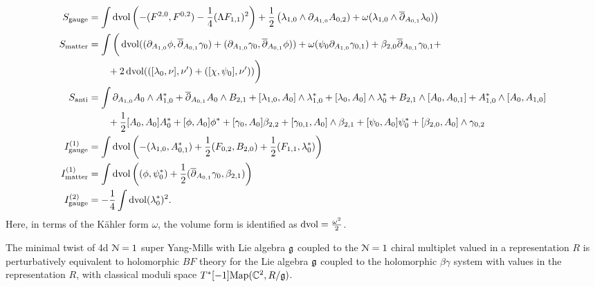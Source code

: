 \documentclass[10pt, oneside]{article}
\begin{document}
\begin{align*}
S_{\mathrm{gauge}} &= \int \operatorname{dvol} \left(-(F^{2, 0}, F^{0, 2}) - \frac{1}{4}(\Lambda F_{1, 1})^2\right) + \frac 12 \left(\lambda_{1,0} \wedge \partial_{A_{1,0}} A_{0,2}) + \omega (\lambda_{1,0} \wedge \overline{\partial}_{A_{0,1}} \lambda_0) \right)  \\
S_{\mathrm{matter}} &= \int \bigg( \operatorname{dvol} ((\partial_{A_{1,0}}\phi , \overline{\partial}_{A_{0,1}} \gamma_0) + (\partial_{A_{1,0}}\gamma_0, \overline{\partial}_{A_{0,1}} \phi)) + \omega (\psi_0 \partial_{A_{1,0}} \gamma_{0,1}) + \beta_{2,0} \overline{\partial}_{A_{0,1}} \gamma_{0,1}  + \\
&\qquad + 2\operatorname{dvol}(([\lambda_0,\nu],\nu') + ([\chi, \psi_0], \nu') )   \bigg) \\
S_{\mathrm{anti}} &= \int \partial_{A_{1, 0}} A_0 \wedge A_{1,0}^* + \overline{\partial}_{A_{0, 1}} A_0\wedge B_{2,1} + [\lambda_{1,0}, A_0]\wedge \lambda_{1,0}^* +  [\lambda_{0}, A_0]\wedge \lambda_{0}^* +B_{2,1} \wedge [A_0, A_{0,1}] + A_{1,0}^* \wedge [A_{0}, A_{1,0}] \\
&\qquad + \frac{1}{2}[A_0, A_0]A_0^* + [\phi, A_0] \phi^* + [\gamma_0, A_0] \beta_{2,2} + [\gamma_{0,1}, A_0]\wedge \beta_{2,1} + [\psi_0, A_0] \psi_0^* + [\beta_{2,0}, A_0] \wedge \gamma_{0,2} \\
I^{(1)}_{\mathrm{gauge}} &=  \int \operatorname{dvol} \left( - (\lambda_{1,0}, A_{0,1}^*) + \frac 12 (F_{0,2},B_{2,0}) + \frac 12 (F_{1,1}, \lambda_0^*)  \right)\\
I^{(1)}_{\mathrm{matter}} &=  \int \operatorname{dvol} \left( (\phi, \psi_0^*) + \frac 12( \overline{\partial}_{A_{0,1}} \gamma_{0}, \beta_{2,1}) \right)\\
I^{(2)}_{\mathrm{gauge}} &= -\frac{1}{4}\int \operatorname{dvol} (\lambda_0^*)^2.
\end{align*}
Here, in terms of the K\"ahler form $\omega$, the volume form is identified as $\operatorname{dvol} = \frac{\omega^2}2$.

\begin{thm} \label{4d_minimal_twist_thm}
The minimal twist of 4d $\mathcal N=1$ super Yang-Mills with Lie algebra $\mathfrak g$ coupled to the $\mathcal N=1$ chiral multiplet valued in a representation $R$ is perturbatively equivalent to holomorphic $BF$ theory for the Lie algebra $\mathfrak g$ coupled to the holomorphic $\beta\gamma$ system with values in the representation $R$, with classical moduli space $T^*[-1]\mathrm{Map}(\mathbb C^2, R/\mathfrak{g})$. 
\end{thm}
\end{document}
